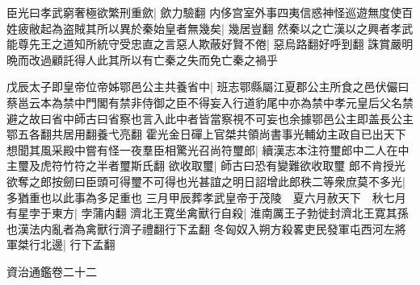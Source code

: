 臣光曰孝武窮奢極欲繁刑重歛|{
	歛力驗翻}
内侈宫室外事四夷信惑神怪巡遊無度使百姓疲敝起為盗賊其所以異於秦始皇者無幾矣|{
	幾居豈翻}
然秦以之亡漢以之興者孝武能尊先王之道知所統守受忠直之言惡人欺蔽好賢不倦|{
	惡烏路翻好呼到翻}
誅賞嚴明晩而改過顧託得人此其所以有亡秦之失而免亡秦之禍乎

戊辰太子即皇帝位帝姊鄂邑公主共養省中|{
	班志鄂縣屬江夏郡公主所食之邑伏儼曰蔡邕云本為禁中門閣有禁非侍御之臣不得妄入行道豹尾中亦為禁中孝元皇后父名禁避之故曰省中師古曰省察也言入此中者皆當察視不可妄也余據鄂邑公主即盖長公主鄂五各翻共居用翻養弋亮翻}
霍光金日磾上官桀共領尚書事光輔幼主政自已出天下想聞其風采殿中嘗有怪一夜羣臣相驚光召尚符璽郎|{
	續漢志本注符璽郎中二人在中主璽及虎符竹符之半者璽斯氏翻}
欲收取璽|{
	師古曰恐有變難欲收取璽}
郎不肯授光欲奪之郎按劒曰臣頭可得璽不可得也光甚誼之明日詔增此郎秩二等衆庶莫不多光|{
	多猶重也以此事為多足重也}
三月甲辰葬孝武皇帝于茂陵　夏六月赦天下　秋七月有星孛于東方|{
	孛蒲内翻}
濟北王寛坐禽獸行自殺|{
	淮南厲王子勃徙封濟北王寛其孫也漢法内亂者為禽獸行濟子禮翻行下孟翻}
冬匈奴入朔方殺畧吏民發軍屯西河左將軍桀行北邊|{
	行下孟翻}


資治通鑑卷二十二
